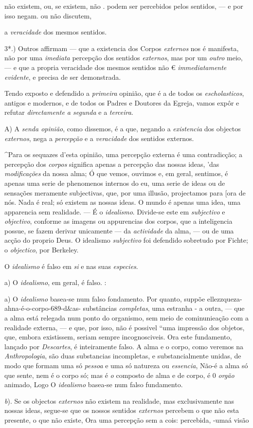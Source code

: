 não existem, ou, se existem, não . podem ser percebidos pelos sentidos, --- e por isso negam. ou não discutem,\par a \emph{veracidade} dos mesmos sentidos.\par 3*.) Outros affirmam --- que a existencia dos Corpos \emph{externos} nos é manifesta, não por uma \emph{imediata} percepção dos sentidos \emph{externos}, mas por um \emph{outro} meio, --- e que a propria veracidade dos mesmos sentidos não € \emph{immediatamente evidente}, e precisa de ser demonstrada.\par Tendo exposto e defendido a \emph{primeira} opinião, que é a de todos os \emph{escholasticos}, antigos e modernos, e de todos os Padres e Doutores da Egreja, vamos expôr e refutar \emph{directamente a segunda} e a \emph{terceira}.\par A) A \emph{senda opinião}, como dissemos, é a que, negando a \emph{existencia} dos objectos \emph{externos}, nega a \emph{percepção} e a \emph{veracidade} dos sentidos externos.\par \textasciicircum{}Para os sequazes d'esta opinião, uma percepção externa é uma contradicção; a percepção dos \emph{corpos} significa apenas a percepção das nossas ideas, 'das \emph{modificações} da nossa alma; Ó que vemos, ouvimos e, em geral, sentimos, é apenas uma serie de phenomenos internos do eu, uma serie de ideas ou de sensações meramente subjectivas, que, por uma illusão, projectamos para [ora de nós. Nada é real; só existem as nossas ideas. O mundo é apenas uma idea, uma apparencia sem realidade. --- É o \emph{idealismo}. Divide-se este em \emph{subjectivo} e \emph{objectivo}, conforme as imagens ou appurencias dos corpos, que a inteligencia possue, se fazem derivar unicamente --- da \emph{actividade} da alma, --- ou de uma acção do proprio Deus. O idealismo \emph{subjectivo} foi defendido sobretudo por Fichte; o \emph{objectico}, por Berkeley.\par O \emph{idealismo} é falso em \emph{si} e nas suas \emph{especies}.\par a) O \emph{idealismo}, em geral, é falso. :\par a) O \emph{idealismo} basea-se num falso fondamento. Por quanto, suppõe ellezzqueza-ahna-é-o-corpo-689-d\&as- substâncias \emph{completas}, uma estranha - a outra, --- que a alma está relegada num ponto do organismo, sem meio de cominunieação com a realidade externa, --- e que, por isso, não é possivel “uma impressão dos objetos, que, embora existissem, seriam sempre incognosciveis. Ora este fundamento, lançado por \emph{Descartes}, é inteiramente falso. A alma e o corpo, como veremos na \emph{Anthropologia}, são duas substancias incompletas, e substancialmente unidas, de modo que formam uma só \emph{pessoa} e uma só natureza ou \emph{essencia}, Não-é a alma só que sente, nem é o corpo só; mas é \emph{o} composto de alma e de corpo, é 0 \emph{orgão} animado, Logo O \emph{idealismo} basea-se num falso fundamento.\par \emph{b}). Se os objectos \emph{externos} não existem na realidade, mas exclusivamente nas nossas ideas, segue-se que os nossos sentidos \emph{externos} percebem o que não esta presente, o que não existe, Ora uma percepção sem a cois: percebida, -umaá visão 